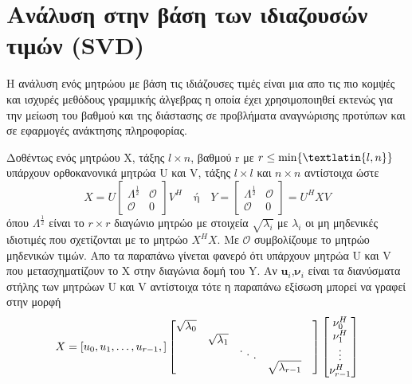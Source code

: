 \section{Ανάλυση στην βάση των ιδιαζουσών τιμών (\textlatin{SVD})}
\par
Η ανάλυση ενός μητρώου με βάση τις ιδιάζουσες τιμές είναι μια απο τις πιο κομψές και ισχυρές μεθόδους γραμμικής άλγεβρας η οποία έχει χρησιμοποιηθεί εκτενώς για την μείωση του βαθμού και της διάστασης σε προβλήματα αναγνώρισης προτύπων και σε εφαρμογές ανάκτησης πληροφορίας.
\par
Δοθέντως ενός μητρώου Χ, τάξης $l \times n$, βαθμού \textlatin{r} με $r \leq \min \lbrace \textlatin{l,n} \rbrace $ υπάρχουν ορθοκανονικά μητρώα \textlatin{U} και \textlatin{V}, τάξης $l \times l$ και $n \times n$ αντίστοιχα ώστε
\newline\hspace*{\fill}
\begin{equation}
	X = U\begin{bmatrix}
	\Lambda^{\frac{1}{2}} & \mathcal{O} \\
	\mathcal{O} & 0
	\end{bmatrix} V^{H} \quad \text{ή} \quad
	Y = \begin{bmatrix}
	\Lambda^{\frac{1}{2}} & \mathcal{O} \\
	\mathcal{O} & 0
	\end{bmatrix} = U^{H}XV 
\end{equation}
\hspace*{\fill}\newline
όπου $ \Lambda^{\frac{1}{2}} $ είναι το $r \times r$ διαγώνιο μητρώο με στοιχεία $ \sqrt{\lambda_{i}} $ με $ \lambda_{i} $ οι μη μηδενικές ιδιοτιμές που σχετίζονται με το μητρώο $X^{H}X$. Με $ \mathcal{O} $ συμβολίζουμε το μητρώο μηδενικών τιμών. Απο τα παραπάνω γίνεται φανερό ότι υπάρχουν μητρώα \textlatin{U} και \textlatin{V} που μετασχηματίζουν το \textlatin{X} στην διαγώνια δομή του \textlatin{Y}. Αν $ \mathbf{u}_{i}$,$\mathbf{\nu}_{i} $ είναι τα διανύσματα στήλης των μητρώων \textlatin{U} και \textlatin{V} αντίστοιχα τότε η παραπάνω εξίσωση μπορεί να γραφεί στην μορφή
\newline\hspace*{\fill}
\begin{equation}
         X = [u_{0},u_{1},\ldots,u_{r-1},] \begin{bmatrix}
\sqrt{\lambda_{0}} &&&& \\
&\sqrt{\lambda_{1}} &&& \\
&& \raise 4pt \hbox {.}
  \mkern 6mu
  \raise 1pt \hbox {.}
  \mkern 6mu
  \raise -2pt \hbox {.} \\
&&& \sqrt{\lambda_{r-1}} \\
\end{bmatrix}
\begin{bmatrix}
	\mathbf{\nu}_{0}^{H} \\
	\mathbf{\nu}_{1}^{H} \\
	\vdots \\
	\mathbf{\nu}_{r-1}^{H} \\
\end{bmatrix}
\end{equation}
